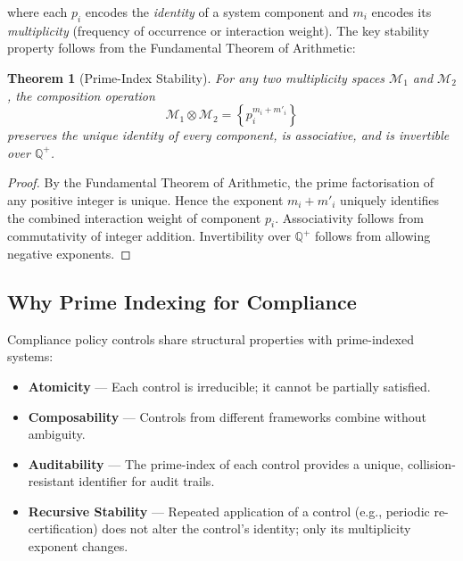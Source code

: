 \documentclass[12pt,letterpaper]{article}
\theoremstyle{definition}
\theoremstyle{plain}
\newtheorem{theorem}{Theorem}[section]
\theoremstyle{remark}
\begin{document}
where each $p_i$ encodes the \emph{identity} of a system component and $m_i$
encodes its \emph{multiplicity} (frequency of occurrence or interaction weight).
The key stability property follows from the Fundamental Theorem of Arithmetic:

\begin{theorem}[Prime-Index Stability]
For any two multiplicity spaces $\mathcal{M}_1$ and $\mathcal{M}_2$, the
composition operation
\begin{equation}
\mathcal{M}_1 \otimes \mathcal{M}_2 = \left\{ p_i^{m_i + m'_i} \right\}
\label{eq:compose}
\end{equation}
preserves the unique identity of every component, is associative, and is
invertible over $\mathbb{Q}^+$.
\end{theorem}

\begin{proof}
By the Fundamental Theorem of Arithmetic, the prime factorisation of any
positive integer is unique. Hence the exponent $m_i + m'_i$ uniquely identifies
the combined interaction weight of component $p_i$. Associativity follows from
commutativity of integer addition. Invertibility over $\mathbb{Q}^+$ follows
from allowing negative exponents.
\end{proof}

\subsection{Why Prime Indexing for Compliance}

Compliance policy controls share structural properties with prime-indexed
systems:

\begin{itemize}
  \item \textbf{Atomicity} --- Each control is irreducible; it cannot be
  partially satisfied.
  \item \textbf{Composability} --- Controls from different frameworks combine
  without ambiguity.
  \item \textbf{Auditability} --- The prime-index of each control provides a
  unique, collision-resistant identifier for audit trails.
  \item \textbf{Recursive Stability} --- Repeated application of a control (e.g.,
  periodic re-certification) does not alter the control's identity; only its
  multiplicity exponent changes.
\end{itemize}

\end{document}
